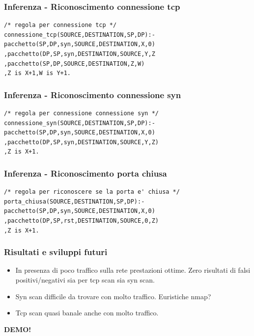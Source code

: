 \documentclass{beamer}
\begin{document}
\begin{frame}[fragile]
\frametitle{Inferenza - Riconoscimento connessione tcp}
\begin{lstlisting}
/* regola per connessione tcp */
connessione_tcp(SOURCE,DESTINATION,SP,DP):-
pacchetto(SP,DP,syn,SOURCE,DESTINATION,X,0)
,pacchetto(DP,SP,syn,DESTINATION,SOURCE,Y,Z
,pacchetto(SP,DP,SOURCE,DESTINATION,Z,W)
,Z is X+1,W is Y+1.
\end{lstlisting}


\end{frame}


\begin{frame}[fragile]
\frametitle{Inferenza - Riconoscimento connessione syn}
\begin{lstlisting}
/* regola per connessione connessione syn */
connessione_syn(SOURCE,DESTINATION,SP,DP):-
pacchetto(SP,DP,syn,SOURCE,DESTINATION,X,0)
,pacchetto(DP,SP,syn,DESTINATION,SOURCE,Y,Z)
,Z is X+1.

\end{lstlisting}
\end{frame}



\begin{frame}[fragile]
\frametitle{Inferenza - Riconoscimento porta chiusa}
\begin{lstlisting}
/* regola per riconoscere se la porta e' chiusa */
porta_chiusa(SOURCE,DESTINATION,SP,DP):-
pacchetto(SP,DP,syn,SOURCE,DESTINATION,X,0)
,pacchetto(DP,SP,rst,DESTINATION,SOURCE,0,Z)
,Z is X+1.

\end{lstlisting}
\end{frame}



\begin{frame}
\frametitle{Risultati e sviluppi futuri}

\begin{itemize}[<+->]
\item In presenza di poco traffico sulla rete prestazioni ottime. Zero risultati di falsi positivi/negativi
sia per tcp scan sia syn scan.
\item Syn scan difficile da trovare con molto traffico. Euristiche nmap? 
\item Tcp scan quasi banale anche con molto traffico.
\end{itemize}

\end{frame}




\begin{frame}
\begin{center}
{\huge \textbf{DEMO!}}
\end{center}
\end{frame}
\end{document}
